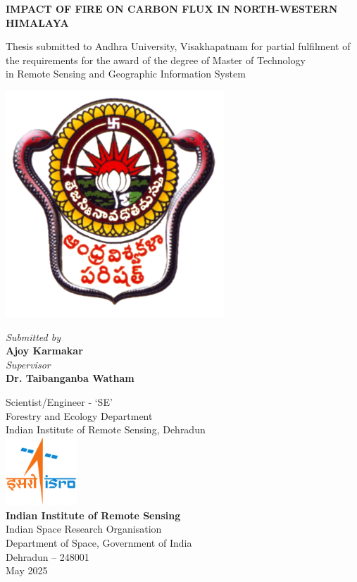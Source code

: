 \documentclass[12pt,a4paper]{report}%
\begin{document}
\begin{titlepage}
   \centering
   \LARGE
    \textbf{
IMPACT OF FIRE ON CARBON FLUX IN NORTH-WESTERN HIMALAYA
}
    
    \vspace{1cm}
    \normalsize \textmd{
    Thesis submitted to Andhra University, Visakhapatnam for partial fulfilment of\\ the requirements for the award of the degree of Master of Technology \\in
    Remote Sensing and Geographic Information System\\
}
\vspace{10 mm}
 
\centering
\includegraphics[width=0.25\linewidth]{photos/Andhra_University_logo.png}
\vspace{5 mm}

\large
\textit{Submitted by}\\
\Large
    \textbf{Ajoy Karmakar}\\
    \vspace{1cm}
\large
    \textit{Supervisor}\\
\Large
    \textbf{Dr. Taibanganba Watham}\\
\vspace{0 mm}

\large
\centering
Scientist/Engineer - ‘SE’\\
Forestry and Ecology Department\\
Indian Institute of Remote Sensing, Dehradun
\vspace{ 10 mm}\\

    \includegraphics[width=0.2\textwidth]{photos/isro_logo.png}\\
    \vspace{2mm}
    \Large
    \textbf{Indian Institute of Remote Sensing}\\
    Indian Space Research Organisation\\
    Department of Space, Government of India\\
    Dehradun – 248001\\
    \vspace{4 mm}
    May 2025
    \normalsize
\end{titlepage}
\end{document}
